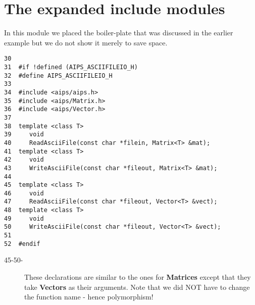 \newpage
\section{The expanded {\bf include} modules}

        In this module we placed the boiler-plate that was discussed in the 
earlier example but we do not show it merely to save space.

\begin{verbatim}
30  
31  #if !defined (AIPS_ASCIIFILEIO_H)
32  #define AIPS_ASCIIFILEIO_H
33  
34  #include <aips/aips.h>
35  #include <aips/Matrix.h>
36  #include <aips/Vector.h>
37  
38  template <class T>
39     void
40     ReadAsciiFile(const char *filein, Matrix<T> &mat);
41  template <class T>
42     void
43     WriteAsciiFile(const char *fileout, Matrix<T> &mat);
44  
45  template <class T>
46     void
47     ReadAsciiFile(const char *fileout, Vector<T> &vect);
48  template <class T>
49     void
50     WriteAsciiFile(const char *fileout, Vector<T> &vect);
51  
52  #endif
\end{verbatim}

\begin{description}
\item[45-50-] These declarations are similar to the ones for {\bf Matrices} except that
they take {\bf Vectors} as their arguments.  Note that we did NOT have to change
the function name - hence polymorphism!
\end{description}


